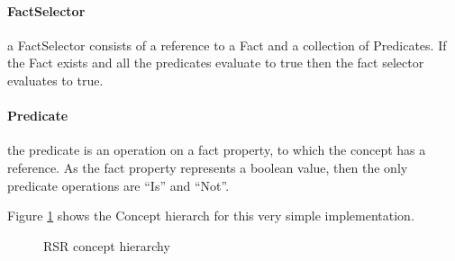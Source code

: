 \paragraph{FactSelector} a FactSelector consists of a reference to a Fact and a collection of Predicates.
If the Fact exists and all the predicates evaluate to true then the fact selector evaluates to true.

\paragraph{Predicate} the predicate is an operation on a fact property, to which the concept has a reference.
As the fact property represents a boolean value, then the only predicate operations are ``Is'' and ``Not''.

Figure \ref{fig:RSRDiagram} shows the Concept hierarch for this very simple implementation.

\begin{figure}[h]
    \centering
    \caption{RSR concept hierarchy}
    \label{fig:RSRDiagram}
\end{figure}

